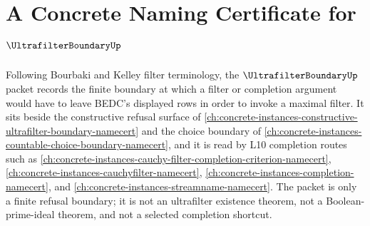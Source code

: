\chapter{A Concrete Naming Certificate for $\UltrafilterBoundaryUp$}
\label{ch:concrete-instances-ultrafilter-boundary-namecert}

Following Bourbaki and Kelley filter terminology, the $\UltrafilterBoundaryUp$ packet records the finite boundary at which a filter or completion argument would have to leave BEDC's displayed rows in order to invoke a maximal filter. It sits beside the constructive refusal surface of \autoref{ch:concrete-instances-constructive-ultrafilter-boundary-namecert} and the choice boundary of \autoref{ch:concrete-instances-countable-choice-boundary-namecert}, and it is read by L10 completion routes such as \autoref{ch:concrete-instances-cauchy-filter-completion-criterion-namecert}, \autoref{ch:concrete-instances-cauchyfilter-namecert}, \autoref{ch:concrete-instances-completion-namecert}, and \autoref{ch:concrete-instances-streamname-namecert}. The packet is only a finite refusal boundary; it is not an ultrafilter existence theorem, not a Boolean-prime-ideal theorem, and not a selected completion shortcut.

